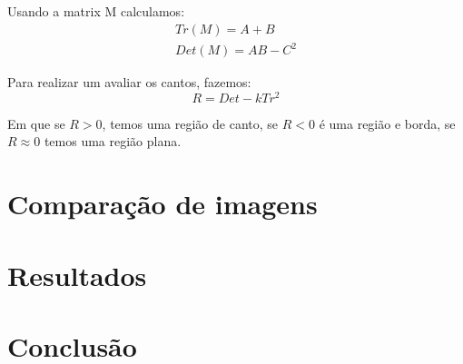 \documentclass[10pt,a4paper]{article}
\begin{document}
\begin{enumerate}
Usando a matrix M calculamos:
\begin{eqnarray*}
Tr(M) = A + B\\
Det(M) = AB-C^2
\end{eqnarray*}

Para realizar um avaliar os cantos, fazemos:
\begin{equation}
R = Det - kTr^2
\end{equation}

Em que se $R>0$, temos uma região de canto, se $R<0$ é uma região e
borda, se $R \approx 0$ temos uma região plana.


\end{enumerate}

\section{Comparação de imagens}

\section{Resultados}

\section{Conclusão}


\begin{small}
  
\end{small}
\end{document}
